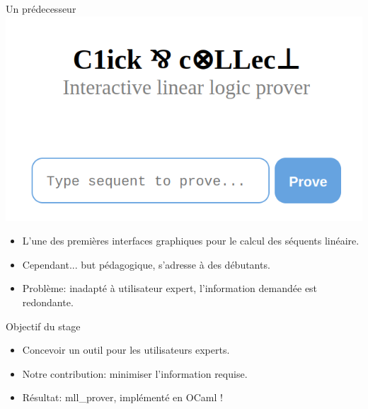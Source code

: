 \documentclass{beamer}
\begin{document}
\begin{frame}{Un prédecesseur}
    \centering
    \includegraphics[scale=0.35]{images/C&C_home.png}

    \pause
    
    \begin{itemize}
        \item L'une des premières interfaces graphiques pour le calcul des séquents linéaire.
            \pause
        \item Cependant... but pédagogique, s'adresse à des débutants.
            \pause
        \item Problème: inadapté à utilisateur expert, l'information demandée est redondante.
    \end{itemize}


\end{frame}

\begin{frame}{Objectif du stage}
    \begin{itemize}
        \item Concevoir un outil pour les utilisateurs experts.
            \pause
        \item Notre contribution: \pause minimiser l'information requise.
            \pause
        \item Résultat: mll\_prover, implémenté en OCaml !
    \end{itemize}
\end{frame}
\end{document}
